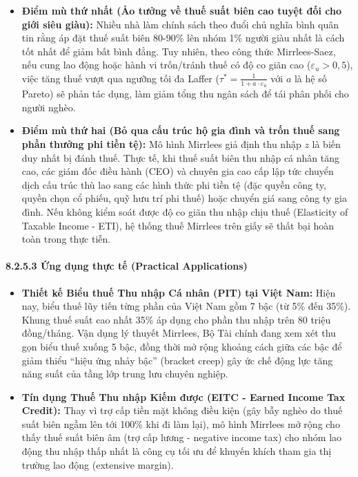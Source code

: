 \documentclass[
]{article}
\providecommand{\tightlist}{%
  \setlength{\itemsep}{0pt}\setlength{\parskip}{0pt}}
\begin{document}
\begin{itemize}
\tightlist
\item
  \textbf{Điểm mù thứ nhất (Ảo tưởng về thuế suất biên cao tuyệt đối cho
  giới siêu giàu):} Nhiều nhà làm chính sách theo đuổi chủ nghĩa bình
  quân tin rằng áp đặt thuế suất biên 80-90\% lên nhóm 1\% người giàu
  nhất là cách tốt nhất để giảm bất bình đẳng. Tuy nhiên, theo công thức
  Mirrlees-Saez, nếu cung lao động hoặc hành vi trốn/tránh thuế có độ co
  giãn cao (\(\varepsilon_u > 0,5\)), việc tăng thuế vượt qua ngưỡng tối
  đa Laffer (\(\tau^* = \frac{1}{1 + a \cdot \varepsilon_u}\) với \(a\)
  là hệ số Pareto) sẽ phản tác dụng, làm giảm tổng thu ngân sách để tái
  phân phối cho người nghèo.
\item
  \textbf{Điểm mù thứ hai (Bỏ qua cấu trúc hộ gia đình và trốn thuế sang
  phần thưởng phi tiền tệ):} Mô hình Mirrlees giả định thu nhập \(z\) là
  biến duy nhất bị đánh thuế. Thực tế, khi thuế suất biên thu nhập cá
  nhân tăng cao, các giám đốc điều hành (CEO) và chuyên gia cao cấp lập
  tức chuyển dịch cấu trúc thù lao sang các hình thức phi tiền tệ (đặc
  quyền công ty, quyền chọn cổ phiếu, quỹ hưu trí phi thuế) hoặc chuyển
  giá sang công ty gia đình. Nếu không kiểm soát được độ co giãn thu
  nhập chịu thuế (Elasticity of Taxable Income - ETI), hệ thống thuế
  Mirrlees trên giấy sẽ thất bại hoàn toàn trong thực tiễn.
\end{itemize}

\paragraph{8.2.5.3 Ứng dụng thực tế (Practical
Applications)}\label{ux1ee9ng-dux1ee5ng-thux1ef1c-tux1ebf-practical-applications-27}

\begin{itemize}
\tightlist
\item
  \textbf{Thiết kế Biểu thuế Thu nhập Cá nhân (PIT) tại Việt Nam:} Hiện
  nay, biểu thuế lũy tiến từng phần của Việt Nam gồm 7 bậc (từ 5\% đến
  35\%). Khung thuế suất cao nhất 35\% áp dụng cho phần thu nhập trên 80
  triệu đồng/tháng. Vận dụng lý thuyết Mirrlees, Bộ Tài chính đang xem
  xét thu gọn biểu thuế xuống 5 bậc, đồng thời mở rộng khoảng cách giữa
  các bậc để giảm thiểu ``hiệu ứng nhảy bậc'' (bracket creep) gây ức chế
  động lực tăng năng suất của tầng lớp trung lưu chuyên nghiệp.
\item
  \textbf{Tín dụng Thuế Thu nhập Kiếm được (EITC - Earned Income Tax
  Credit):} Thay vì trợ cấp tiền mặt không điều kiện (gây bẫy nghèo do
  thuế suất biên ngầm lên tới 100\% khi đi làm lại), mô hình Mirrlees mở
  rộng cho thấy thuế suất biên âm (trợ cấp lương - negative income tax)
  cho nhóm lao động thu nhập thấp nhất là công cụ tối ưu để khuyến khích
  tham gia thị trường lao động (extensive margin).
\end{itemize}
\end{document}
